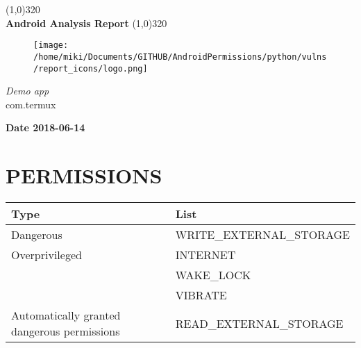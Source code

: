 \documentclass[12p]{article}
\begin{document}
\begin{titlepage}
\begin{center}
\line(1,0){320}\\
[0.25in]
\huge{\bfseries Android Analysis Report}
\line(1,0){320}\\
[0.5in]
\begin{figure}[H]
	\centering
	\texttt{[image: /home/miki/Documents/GITHUB/AndroidPermissions/python/vulns/report\_icons/logo.png]}
\end{figure}
\textsl{\LARGE Demo app}\\
\textsf{\LARGE com.termux}\\
[2.5in]
\end{center}
\begin{flushright}
\textbf{\large Date 2018-06-14}
\end{flushright}
\end{titlepage}
\tableofcontents
\thispagestyle{empty}
\cleardoublepage
\setcounter{page}{1}
\section{PERMISSIONS}
	\begin{longtable}{p{3cm} p{10cm} }
	\rowcolor{grannysmithapple!70} Type & List \\
\hline
Dangerous &  WRITE\_EXTERNAL\_STORAGE \\ 
\hline
Overprivileged &  INTERNET \\ 
 &  WAKE\_LOCK \\ 
 &  VIBRATE \\ 
\hline
\hline
Automatically granted dangerous permissions &  READ\_EXTERNAL\_STORAGE \\ 
\hline
	\end{longtable}
\end{document}
